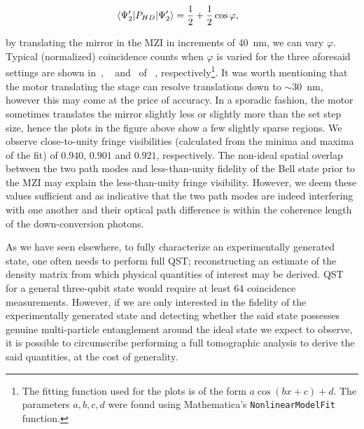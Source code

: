 \begin{align}
	&\ev{P_{HD}}{\Psi_2'} = \frac{1}{2} + \frac{1}{2}\cos{\varphi},
\end{align}

\noindent
by translating the mirror in the \acs{MZI} in increments of \SI{40}{nm}, we can vary $\varphi$. Typical (normalized) coincidence counts when $\varphi$ is varied for the three aforesaid settings are shown in~, ~ and~ of ~, respectively\footnote{The fitting function used for the plots is of the form $a \cos{(b x + c) + d}$. The parameters $a,b,c,d$ were found using Mathematica's \texttt{NonlinearModelFit} function.}. It was worth mentioning that the motor translating the stage can resolve translations down to $\sim$\SI{30}{nm}, however this may come at the price of accuracy. In a sporadic fashion, the motor sometimes translates the mirror slightly less or slightly more than the set step size, hence the plots in the figure above show a few slightly sparse regions. We observe close-to-unity fringe visibilities (calculated from the minima and maxima of the fit) of $0.940$, $0.901$ and $0.921$, respectively. The non-ideal spatial overlap between the two path modes and less-than-unity fidelity of the Bell state prior to the \acs{MZI} may explain the less-than-unity fringe visibility. However, we deem these values sufficient and as indicative that the two path modes are indeed interfering with one another and their optical path difference is within the coherence length of the down-conversion photons. 

\bigskip
\noindent
As we have seen elsewhere, to fully characterize an experimentally generated state, one often needs to perform full \acs{QST}; reconstructing an estimate of the density matrix from which physical quantities of interest may be derived. \acs{QST} for a general three-qubit state would require at least $64$ coincidence measurements. However, if we are only interested in the fidelity of the experimentally generated state and detecting whether the said state possesses genuine multi-particle entanglement around the ideal state we expect to observe, it is possible to circumscribe performing a full tomographic analysis to derive the said quantities, at the cost of generality. 


\clearpage

